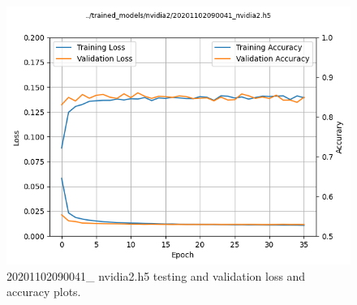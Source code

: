 \begin{figure}[ht]
\centering
\includegraphics[width=\textwidth]{Figures/20201102090041_nvidia2_accuracy.png}
\caption{20201102090041\_ nvidia2.h5 testing and validation loss and accuracy plots. }
\label{fig:20201102090041_nvidia2_accuracy}
\end{figure}

